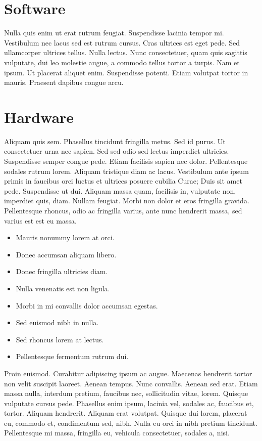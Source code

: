 \documentclass[oneside]{mgr}
\begin{document}
\section{Software}
Nulla quis enim ut erat rutrum feugiat. Suspendisse lacinia tempor
mi. Vestibulum nec lacus sed est rutrum cursus. Cras ultrices est eget
pede. Sed ullamcorper ultrices tellus. Nulla lectus. Nunc
consectetuer, quam quis sagittis vulputate, dui leo molestie augue, a
commodo tellus tortor a turpis. Nam et ipsum. Ut placerat aliquet
enim. Suspendisse potenti. Etiam volutpat tortor in mauris. Praesent
dapibus congue arcu.

\section{Hardware}
Aliquam quis sem. Phasellus tincidunt fringilla metus. Sed id
purus. Ut consectetuer urna nec sapien. Sed sed odio sed lectus
imperdiet ultricies. Suspendisse semper congue pede. Etiam facilisis
sapien nec dolor. Pellentesque sodales rutrum lorem. Aliquam tristique
diam ac lacus. Vestibulum ante ipsum primis in faucibus orci luctus et
ultrices posuere cubilia Curae; Duis sit amet pede. Suspendisse ut
dui. Aliquam massa quam, facilisis in, vulputate non, imperdiet quis,
diam. Nullam feugiat. Morbi non dolor et eros fringilla
gravida. Pellentesque rhoncus, odio ac fringilla varius, ante nunc
hendrerit massa, sed varius est est eu massa.


\begin{itemize}
\item Mauris nonummy lorem at orci.
\item Donec accumsan aliquam libero.
\item Donec fringilla ultricies diam.
\item Nulla venenatis est non ligula.
\item Morbi in mi convallis dolor accumsan egestas.
\item Sed euismod nibh in nulla.
\item Sed rhoncus lorem at lectus.
\item Pellentesque fermentum rutrum dui.
\end{itemize}

Proin euismod. Curabitur adipiscing ipsum ac augue. Maecenas hendrerit
tortor non velit suscipit laoreet. Aenean tempus. Nunc
convallis. Aenean sed erat. Etiam massa nulla, interdum pretium,
faucibus nec, sollicitudin vitae, lorem. Quisque vulputate cursus
pede. Phasellus enim ipsum, lacinia vel, sodales ac, faucibus et,
tortor. Aliquam hendrerit. Aliquam erat volutpat. Quisque dui lorem,
placerat eu, commodo et, condimentum sed, nibh. Nulla eu orci in nibh
pretium tincidunt. Pellentesque mi massa, fringilla eu, vehicula
consectetuer, sodales a, nisi.
\end{document}
